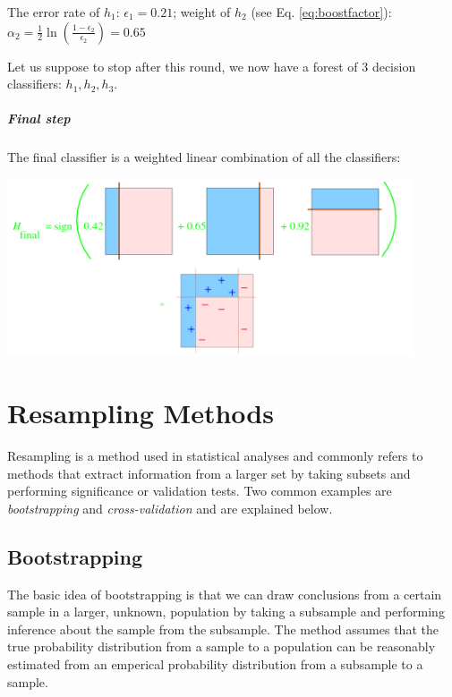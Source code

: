 \begin{appendices}
The error rate of $h_1$: $\epsilon_1 = 0.21$; weight of $h_2$ (see Eq. \ref{eq:boostfactor}): $\alpha_2 = \frac{1}{2} \ln\left(\frac{1-\epsilon_2}{\epsilon_2}\right) = 0.65$

Let us suppose to stop after this round, we now have a forest of 3 decision classifiers: $h_1,h_2,h_3$.

\paragraph{Final step}
The final classifier is a weighted linear combination of all the classifiers:


\begin{center}
\includegraphics[width=12cm]{appendix/img/adaboost5.png}
\end{center}

\usechapterimagefalse
{}
\chapter{Resampling Methods}
\label{ch:resampling}
\usechapterimagetrue

Resampling is a method used in statistical analyses and commonly refers to methods that extract information from a larger set by taking subsets and performing significance or validation tests. Two common examples are \textit{bootstrapping} and \textit{cross-validation} and are explained below.

\section{Bootstrapping}
The basic idea of bootstrapping is that we can draw conclusions from a certain sample in a larger, unknown, population by taking a subsample and performing inference about the sample from the subsample. The method assumes that the true probability distribution from a sample to a population can be reasonably estimated from an emperical probability distribution from a subsample to a sample.


\end{appendices}
